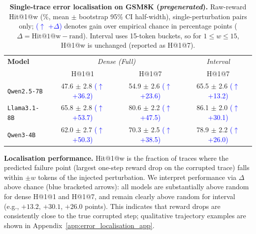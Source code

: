 \begin{table}
\vspace{-0.45em}
\renewcommand{\arraystretch}{1.10}
\setlength{\tabcolsep}{3.1pt}
\centering
\scriptsize
\begin{tabular}{l c c c}
\toprule
\textbf{Model} & \multicolumn{2}{c}{\textit{Dense (Full)}} & \textit{Interval} \\
& H@1@1 & H@1@7 & H@1@7 \\
\midrule
\texttt{Qwen2.5-7B} & 47.6 {\scriptsize\color{gray}$\pm$ 2.8} {\scriptsize\textcolor{blue}{($\uparrow$ +36.2)}} & 54.9 {\scriptsize\color{gray}$\pm$ 2.6} {\scriptsize\textcolor{blue}{($\uparrow$ +23.6)}} & 65.5 {\scriptsize\color{gray}$\pm$ 2.6} {\scriptsize\textcolor{blue}{($\uparrow$ +13.2)}} \\
\texttt{Llama3.1-8B} & 65.8 {\scriptsize\color{gray}$\pm$ 2.8} {\scriptsize\textcolor{blue}{($\uparrow$ +53.7)}} & 80.6 {\scriptsize\color{gray}$\pm$ 2.2} {\scriptsize\textcolor{blue}{($\uparrow$ +47.5)}} & 86.1 {\scriptsize\color{gray}$\pm$ 2.0} {\scriptsize\textcolor{blue}{($\uparrow$ +30.1)}} \\
\texttt{Qwen3-4B} & 62.0 {\scriptsize\color{gray}$\pm$ 2.7} {\scriptsize\textcolor{blue}{($\uparrow$ +50.3)}} & 70.3 {\scriptsize\color{gray}$\pm$ 2.5} {\scriptsize\textcolor{blue}{($\uparrow$ +38.5)}} & 78.9 {\scriptsize\color{gray}$\pm$ 2.2} {\scriptsize\textcolor{blue}{($\uparrow$ +26.0)}} \\
\bottomrule
\end{tabular}
\vspace{0.25em}
\caption{\textbf{Single-trace error localisation on \textsc{GSM8K} (\textit{pregenerated}).} Raw-reward Hit@1@w (\%, mean \(\pm\) bootstrap 95\% CI half-width), single-perturbation pairs only; \textcolor{blue}{($\uparrow$ +\(\Delta\))} denotes gain over empirical chance in percentage points (\(\Delta = \mathrm{Hit@1@w} - \mathrm{rand}\)). Interval uses 15-token buckets, so for \(1 \le w \le 15\), H@1@w is unchanged (reported as H@1@7).}
\label{tab:localisation_merged_pregenerated_raw}
\vspace{-0.70em}
\end{table}

\textbf{Localisation performance.} Hit@1@w is the fraction of traces where the predicted failure point (largest one-step reward drop on the corrupted trace) falls within \(\pm w\) tokens of the injected perturbation. We interpret performance via \(\Delta\) above chance (blue bracketed arrows): all models are substantially above random for dense H@1@1 and H@1@7, and remain clearly above random for interval (e.g., \(+13.2\), \(+30.1\), \(+26.0\) points). This indicates that reward drops are consistently close to the true corrupted step; qualitative trajectory examples are shown in Appendix~\ref{app:error_localisation_app}.
